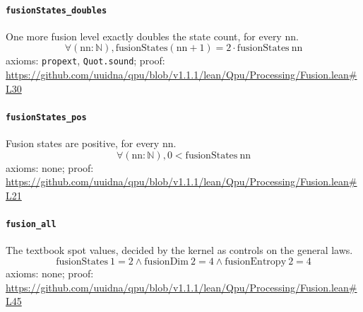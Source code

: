 \documentclass[11pt]{article}
\begin{document}
\paragraph{\texttt{fusionStates\_doubles}}
One more fusion level exactly doubles the state count, for every nn.
\[ \forall (\mathrm{nn} : \mathbb{N}), \mathrm{fusionStates} (\mathrm{nn} + 1) = 2 \cdot \mathrm{fusionStates}\ \mathrm{nn} \]
\noindent axioms: \texttt{propext}, \texttt{Quot.sound}; proof: \url{https://github.com/uuidna/qpu/blob/v1.1.1/lean/Qpu/Processing/Fusion.lean\#L30}

\paragraph{\texttt{fusionStates\_pos}}
Fusion states are positive, for every nn.
\[ \forall (\mathrm{nn} : \mathbb{N}), 0 < \mathrm{fusionStates}\ \mathrm{nn} \]
\noindent axioms: none; proof: \url{https://github.com/uuidna/qpu/blob/v1.1.1/lean/Qpu/Processing/Fusion.lean\#L21}

\paragraph{\texttt{fusion\_all}}
The textbook spot values, decided by the kernel as controls on the general laws.
\[ \mathrm{fusionStates}\ 1 = 2 \land \mathrm{fusionDim}\ 2 = 4 \land \mathrm{fusionEntropy}\ 2 = 4 \]
\noindent axioms: none; proof: \url{https://github.com/uuidna/qpu/blob/v1.1.1/lean/Qpu/Processing/Fusion.lean\#L45}
\end{document}
